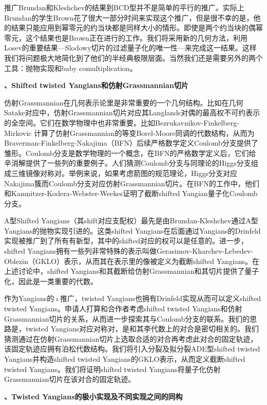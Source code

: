 \documentclass[12pt,UTF8,AutoFakeBold=4,a4paper]{ctexart}
\begin{document}
推广Brundan和Kleshchev的结果到BCD型并不是简单的平行的推广。实际上Brundan的学生Brown花了很大一部分时间来实现这个推广，但是很不幸的是，他的结果只能应用到幂零元的约当块都是同样大小的情形。即使是两个约当块的偶幂零元，这个结果也是Brown正在进行的工作。我们将采用新的几何方法，利用Losev的重要结果---Slodowy切片的过滤量子化的唯一性---来完成这一结果。这样我们将问题极大地简化到了他们的半经典极限层面。当然我们还是需要另外的两个工具：抛物实现和baby comultiplication。

\medskip

\textbf{、Shifted twisted Yangians和仿射Grassmannian切片}

仿射Grassmannian在几何表示论里是非常重要的一个几何结构。比如在几何Satake对应中，仿射Grassmannian切片对应其Langlands对偶的最高权不可约表示的全空间。它们在数学物理中也非常重要。比如Bezrukavnikov-Finkelberg-Mirkovic 计算了仿射Grassmannian的等变Borel-Moore同调的代数结构，从而为Braverman-Finkelberg-Nakajima（BFN）后续严格数学定义Coulomb分支提供了雏形。Coulomb分支是数学物理的一个概念，在BFN的严格数学定义后，它们给辛消解提供了一些列的重要例子。人们猜测Coulomb分支与同理论的Higgs分支组成三维镜像对称对。举例来说，如果考虑箭图的规范理论，Higgs分支对应Nakajima簇而Coulomb分支对应仿射Grassmannian切片。在BFN的工作中，他们和Kamnitzer-Kodera-Webster-Weekes证明了截断shifted Yangian量子化Coulomb分支。

A型Shifted Yangians（其shift对应支配权）最先是由Brundan-Kleshchev通过A型Yangians的抛物实现引进的。这类shifted Yangians在后面通过Yangians的Drinfeld实现被推广到了所有有新型，其中的shifted对应的权可以是任意的。进一步，shifted Yangians拥有一些列非常特殊的表示叫做Gerasimov-Kharchev-Lebedev-Oblezin（GKLO）表示，从而其在表示里的像被定义为截断shifted Yangians。在上述讨论中，shifted Yangians和其截断给仿射Grassmannian和其切片提供了量子化，因此是一类重要的代数。

作为Yangians的$\imath$推广，twisted Yangians也拥有Drinfeld实现从而可以定义shifted twisted Yangians。申请人打算和合作者考虑shifted twisted Yangians和仿射Grassmannian切片的关系，从而进一步探索其与Coulomb分支的联系。我们的思路是，twisted Yangians对应对称对，是和其李代数上的对合是密切相关的。我们猜测通过在仿射Grassmannian切片上选取合适的对合再考虑此对合的固定轨迹，该固定轨迹应拥有泊松代数结构。我们将引入分裂及拟分裂ADE型shifted twisted Yangians并构造shifted twisted Yangians的GKLO表示，从而定义截断shifted twisted Yangians。我们将证明shifted twisted Yangians将量子化仿射Grassmannian切片在该对合的固定轨迹。

\medskip

\textbf{、Twisted Yangians的极小实现及不同实现之间的同构}
\end{document}

